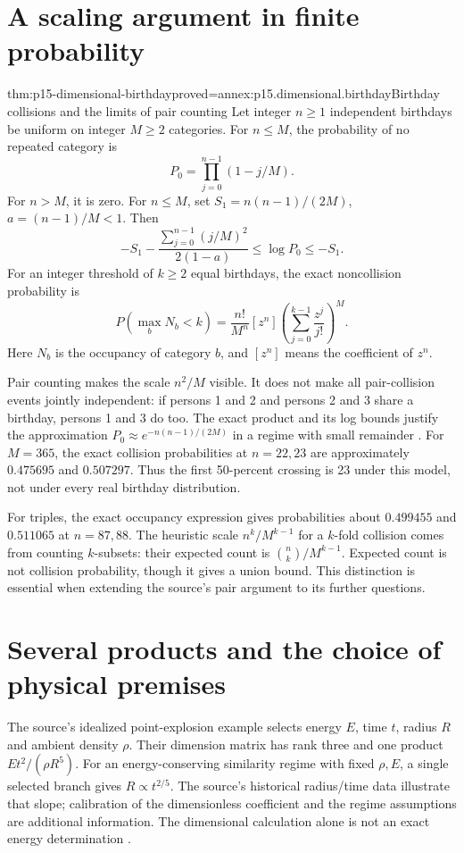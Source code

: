 \section{A scaling argument in finite probability}
\label{sec:p15-dimensional-birthday}

\begin{hbtheorem}{thm:p15-dimensional-birthday}{proved=annex:p15.dimensional.birthday}{Birthday collisions and the limits of pair counting}
Let integer \(n\geq1\) independent birthdays be uniform on integer \(M\geq2\) categories.
For \(n\leq M\), the probability of no repeated category is
\[
 P_0=\prod_{j=0}^{n-1}(1-j/M).
\]
For \(n>M\), it is zero. For \(n\leq M\), set
\(S_1=n(n-1)/(2M)\), \(a=(n-1)/M<1\). Then
\[
 -S_1-\frac{\sum_{j=0}^{n-1}(j/M)^2}{2(1-a)}
 \leq\log P_0\leq-S_1.
\]
For an integer threshold of \(k\geq2\) equal birthdays, the exact noncollision
probability is
\[
 P(\max_b N_b<k)=\frac{n!}{M^n}[z^n]
       \left(\sum_{j=0}^{k-1}\frac{z^j}{j!}\right)^M.
\]
Here \(N_b\) is the occupancy of category \(b\), and \([z^n]\) means
the coefficient of \(z^n\).
\end{hbtheorem}

Pair counting makes the scale \(n^2/M\) visible. It does not make all
pair-collision events jointly independent: if persons 1 and 2 and persons
2 and 3 share a birthday, persons 1 and 3 do too.
The exact product and its log bounds justify the approximation
\(P_0\approx e^{-n(n-1)/(2M)}\) in a regime with small remainder
\cite[4.4]{Mahajan2014Insight}. For \(M=365\), the exact collision
probabilities at \(n=22,23\) are approximately \(0.475695\) and \(0.507297\).
Thus the first 50-percent crossing is 23 under this model, not under every
real birthday distribution.

For triples, the exact occupancy expression gives probabilities about
\(0.499455\) and \(0.511065\) at \(n=87,88\).
The heuristic scale \(n^k/M^{k-1}\) for a \(k\)-fold collision comes from
counting \(k\)-subsets: their expected count is
\(\binom nk/M^{k-1}\). Expected count is not collision probability,
though it gives a union bound. This distinction is essential when extending
the source's pair argument to its further questions.

\section{Several products and the choice of physical premises}
\label{sec:p15-dimensional-multiple-groups}

The source's idealized point-explosion example selects energy \(E\), time
\(t\), radius \(R\) and ambient density \(\rho\). Their dimension matrix
has rank three and one product \(Et^2/(\rho R^5)\).
For an energy-conserving similarity regime with fixed \(\rho,E\), a
single selected branch gives \(R\propto t^{2/5}\).
The source's historical radius/time data illustrate that slope; calibration
of the dimensionless coefficient and the regime assumptions are additional
information. The dimensional calculation alone is not an exact energy
determination \cite[5.2.2]{Mahajan2014Insight}.

